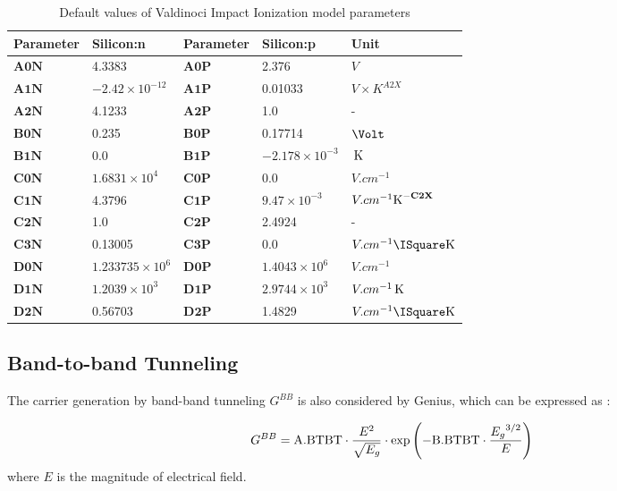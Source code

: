 \documentclass[oneside,12pt]{cgd_book}
\begin{document}
\begin{longtable}{lllll}
\caption{\label{tab:Equation:II:Valdinoci:Param}Default values of Valdinoci Impact Ionization model parameters} \\
\hline
 Parameter
& Silicon:n
& Parameter
& Silicon:p
& Unit\\
\hline
$\mathbf{A0N}$
& 4.3383
& $\mathbf{A0P}$
& 2.376
& $V$
\\
 $\mathbf{A1N}$
& $-2.42\times10^{-12}$
& $\mathbf{A1P}$
& 0.01033
& $V \times K^{A2X}$
\\
 $\mathbf{A2N}$
& 4.1233
& $\mathbf{A2P}$
& 1.0
& -
\\
 $\mathbf{B0N}$
& 0.235
& $\mathbf{B0P}$
& 0.17714
& $\Volt$
\\
 $\mathbf{B1N}$
& 0.0
& $\mathbf{B1P}$
& $-2.178\times10^{-3}$
& $\,\text{K}$
\\
 $\mathbf{C0N}$
& $1.6831\times10^4$
& $\mathbf{C0P}$
& 0.0
& $V.cm^{-1}$
\\
 $\mathbf{C1N}$
& 4.3796
& $\mathbf{C1P}$
& $9.47\times10^{-3}$
& $V.cm^{-1}\text{K}^{-{\bf C2X}}$
\\
 $\mathbf{C2N}$
& 1.0
& $\mathbf{C2P}$
& 2.4924
& -
\\
 $\mathbf{C3N}$
& 0.13005
& $\mathbf{C3P}$
& 0.0
& $V.cm^{-1}\ISquare\Kelvin$
\\
 $\mathbf{D0N}$
& $1.233735\times10^6$
& $\mathbf{D0P}$
& $1.4043\times10^6$
& $V.cm^{-1}$
\\
 $\mathbf{D1N}$
& $1.2039\times10^3$
& $\mathbf{D1P}$
& $2.9744\times10^3$
& $V.cm^{-1}\,\text{K}$
\\
 $\mathbf{D2N}$
& 0.56703
& $\mathbf{D2P}$
& 1.4829
& $V.cm^{-1}\ISquare\Kelvin$\\
\end{longtable}

\par
\subsection{Band-to-band Tunneling}
\par
{}The carrier generation by band-band tunneling
$G^{BB}$ is also considered by
          Genius, which can be expressed as \cite[Kane1959]{}\cite[Liou1990]{}:
\par
\par
\begin{equation}
G^{BB} = {\rm A.BTBT} \cdot \frac{E^2}{ \sqrt {E_g} } \cdot \exp \left( -{\rm B.BTBT} \cdot
          \dfrac{ {E_g}^{3/2} }{E} \right)
\end{equation}
where $E$ is the magnitude of electrical field.
\par
\end{document}
